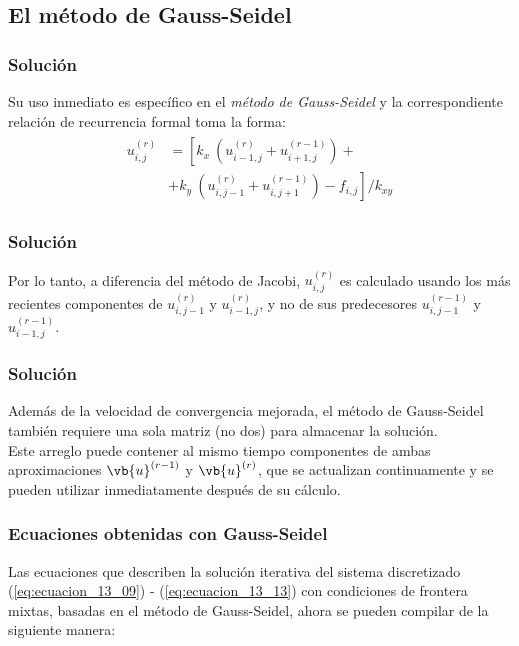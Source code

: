 \subsection{El método de Gauss-Seidel}
\begin{frame}
\frametitle{Solución}
Su uso inmediato es específico en el \emph{método de Gauss-Seidel} y la correspondiente relación de recurrencia formal toma la forma:
\begin{align}
\begin{aligned}
u_{i,j}^{(r)} &= \left[ k_{x} \: \left( u_{i-1,j}^{(r)} + u_{i+1, j}^{(r-1)} \right) + \right. \\
&+ \left. k_{y} \: \left( u_{i,j-1}^{(r)} + u_{i, j+1}^{(r-1)} \right) - f_{i,j} \right] / k_{xy}
\end{aligned}
\label{eq:ecuacion_13_23} 	
\end{align}
\end{frame}
\begin{frame}
\frametitle{Solución}
Por lo tanto, a diferencia del método de Jacobi, $u_{i,j}^{(r)}$ es calculado usando los más recientes componentes de $u_{i,j-1}^{(r)}$ y $u_{i-1, j}^{(r)}$, y no de sus predecesores $u_{i,j-1}^{(r-1)}$ y $u_{i-1, j}^{(r-1)}$.
\end{frame}
\begin{frame}
\frametitle{Solución}
Además de la velocidad de convergencia mejorada, el método de Gauss-Seidel también requiere una sola matriz (no dos) para almacenar la solución.
\\
\bigskip
Este arreglo puede contener al mismo tiempo componentes de ambas aproximaciones $\vb{u}^{(r-1)}$ y $\vb{u}^{(r)}$, que se actualizan continuamente y se pueden utilizar inmediatamente después de su cálculo.
\end{frame}
\begin{frame}
\frametitle{Ecuaciones obtenidas con Gauss-Seidel}
Las ecuaciones que describen la solución iterativa del sistema discretizado (\ref{eq:ecuacion_13_09}) -  (\ref{eq:ecuacion_13_13}) con condiciones de frontera mixtas, basadas en el método de Gauss-Seidel, ahora se pueden compilar de la siguiente manera:
\end{frame}
